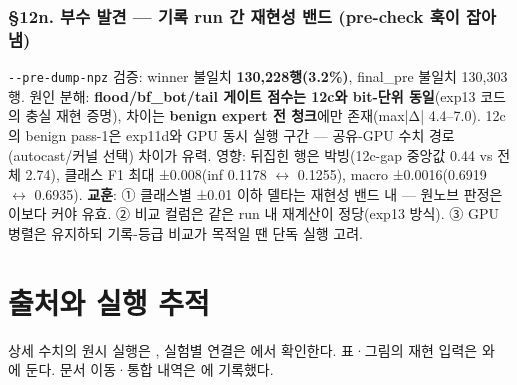\subsubsection{§12n. 부수 발견 — 기록 run 간 재현성 밴드 (pre-check 훅이 잡아냄)}
\texttt{-\allowbreak{}-\allowbreak{}pre-\allowbreak{}du\allowbreak{}mp-\allowbreak{}npz} 검증: winner 불일치 \textbf{130,228행(3.2\%)}, final\_\allowbreak{}pre 불일치 130,303행. 원인 분해: \textbf{flood/\allowbreak{}bf\_\allowbreak{}bot/\allowbreak{}tail 게이트 점수는 12c와 bit-단위 동일}(exp13 코드의 충실 재현 증명), 차이는 \textbf{benign expert 전 청크}에만 존재(max|Δ| 4.4–7.0). 12c의 benign pass-1은 exp11d와 GPU 동시 실행 구간 — 공유-GPU 수치 경로(autocast/\allowbreak{}커널 선택) 차이가 유력. 영향: 뒤집힌 행은 박빙(12c-gap 중앙값 0.44 vs 전체 2.74), 클래스 F1 최대 ±0.008(inf 0.1178 \ensuremath{\leftrightarrow} 0.1255), macro ±0.0016(0.6919 \ensuremath{\leftrightarrow} 0.6935). \textbf{교훈}: ① 클래스별 ±0.01 이하 델타는 재현성 밴드 내 — 원노브 판정은 이보다 커야 유효. ② 비교 컬럼은 같은 run 내 재계산이 정당(exp13 방식). ③ GPU 병렬은 유지하되 기록-등급 비교가 목적일 땐 단독 실행 고려.



\section*{출처와 실행 추적}

상세 수치의 원시 실행은 , 실험별 연결은 에서 확인한다. 표·그림의 재현 입력은 와 에 둔다. 문서 이동·통합 내역은 에 기록했다.


